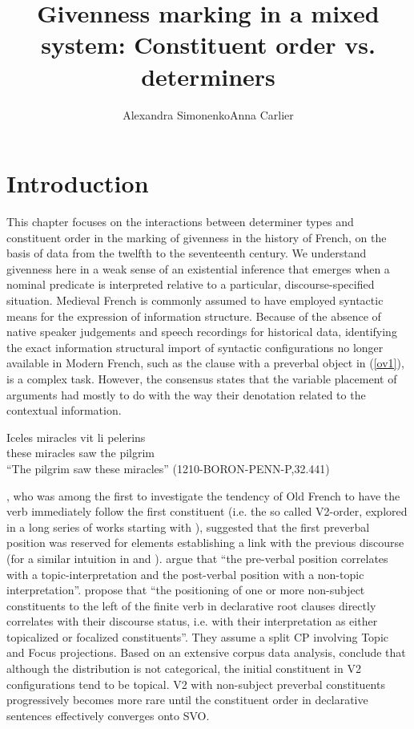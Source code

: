 \documentclass[output=paper,modfonts,nonflat]{langsci/langscibook}
\title{Givenness marking in a mixed system: Constituent order vs. determiners}
\author{Alexandra Simonenko\affiliation{Research Foundation Flanders \& Ghent University}\lastand Anna Carlier\affiliation{Université de Lille}}
\begin{document}
\maketitle
\section{Introduction} 

This chapter focuses on the interactions between determiner types and constituent order in the marking of givenness in the history of French, on the basis of data from the twelfth to the seventeenth century. We understand givenness here in a weak sense of an existential inference that emerges when a nominal predicate is interpreted relative to a particular, discourse-specified situation. Medieval French is commonly assumed to have employed syntactic means for the expression of information structure. Because of the absence of native speaker judgements and speech recordings for historical data, identifying the exact information structural import of syntactic configurations no longer available in Modern French, such as the clause with a preverbal object in (\ref{ov1}), is a complex task. However, the consensus states that the variable placement of arguments had mostly to do with the way their denotation related to the contextual information.

\ea \label{ov1}
\gll Iceles miracles vit li pelerins\\
 these miracles saw the pilgrim\\
\glt ``The pilgrim saw these miracles'' \hfill (1210-BORON-PENN-P,32.441)\label{ex:ovs}
\z



\citet{MarchelloNizia:1995}, who was among the first to investigate the tendency of Old French to have the verb immediately follow the first constituent (i.e. the so called V2-order, explored in a long series of works starting with \citet{Skarup:1975}), suggested that the first preverbal position was reserved for elements establishing a link with the previous discourse (for a similar intuition in \citet{Vennemann:1974} and \citet{Harris:1978}). \citet[117]{RinkeMeisel:2009} argue that ``the pre-verbal position correlates with a topic-interpretation and the post-verbal position with a non-topic interpretation''. \citet[24]{KaiserZimmermann:2011} propose that ``the positioning of one or more non-subject constituents to the left of the finite verb in declarative root clauses directly correlates with their discourse status, i.e. with their interpretation as either topicalized or focalized constituents''. They assume a split CP involving Topic and Focus projections. Based on an extensive corpus data analysis, \citet{LabelleHirschbuhler:2018} conclude that although the distribution is not categorical, the initial constituent in V2 configurations tend to be topical. V2 with non-subject preverbal constituents progressively becomes more rare until the constituent order in declarative sentences effectively converges onto SVO.
\end{document}
